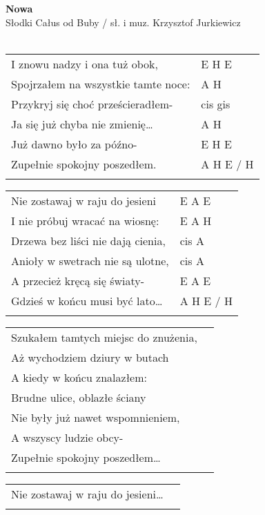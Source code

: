\documentclass[a5paper]{article}
\begin{document}


\noindent
\fontsize{12pt}{15pt}\selectfont
\textbf{Nowa} \\
\fontsize{8pt}{10pt}\selectfont
Słodki Całus od Buby / sł. i muz. Krzysztof Jurkiewicz \\ \\
\fontsize{10pt}{12pt}\selectfont
{}
\begin{tabular}{@{}p{8.00cm}p{3cm}@{}}
\noindent
I znowu nadzy i ona tuż obok, & E H E \\
Spojrzałem na wszystkie tamte noce: & A H \\
Przykryj się choć prześcieradłem- & cis gis \\
Ja się już chyba nie zmienię… & A H \\
Już dawno było za późno- & E H E \\
Zupełnie spokojny poszedłem. & A H E / H \\ \\
\end{tabular}

\noindent
\begin{tabular}{@{}p{7.00cm}p{3cm}@{}}
Nie zostawaj w raju do jesieni & E A E \\
I nie próbuj wracać na wiosnę: & E A H \\
Drzewa bez liści nie dają cienia, & cis A \\
Anioły w swetrach nie są ulotne, & cis A \\
A przecież kręcą się światy- & E A E \\
Gdzieś w końcu musi być lato… & A H E / H \\ \\
\end{tabular}

\noindent
\begin{tabular}{@{}p{7.00cm}p{3cm}@{}}
Szukałem tamtych miejsc do znużenia, \\
Aż wychodziem dziury w butach \\
A kiedy w końcu znalazłem:\\
Brudne ulice, oblazłe ściany\\ 
Nie były już nawet wspomnieniem,  \\
A wszyscy ludzie obcy- \\
Zupełnie spokojny poszedłem… \\ \\
\end{tabular}

\noindent
\begin{tabular}{@{}p{7.00cm}p{3cm}@{}}
Nie zostawaj w raju do jesieni… \\ \\
\end{tabular}
\end{document}
